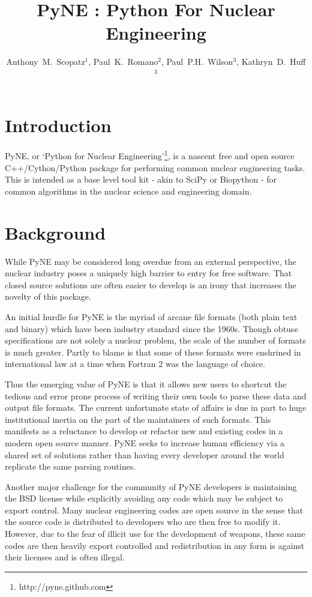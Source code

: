 \documentclass{anstrans}
\title{PyNE : Python For Nuclear Engineering}
\author{Anthony~M.~Scopatz$^1$, Paul~K.~Romano$^2$, Paul~P.H.~Wilson$^3$, Kathryn~D.~Huff$^3$}
\institute{$^1$ University of Chicago, $^2$ Massachusetts Institute of Technology, $^3$ University of Wisconsin }
\date{}
\begin{document}
\section{Introduction}

PyNE, or `Python for Nuclear Engineering'\footnote{http://pyne.github.com}, is a
nascent free and open source C++/Cython/Python package for performing common
nuclear engineering tasks.  This is intended as a base level tool kit - akin to
SciPy or Biopython - for common algorithms in the nuclear science and
engineering domain.

\section{Background}

While PyNE may be considered long overdue from an external perspective, the 
nuclear industry poses a uniquely high barrier to entry for free software.  
That closed source solutions are often easier to develop is an irony that 
increases the novelty of this package.

An initial hurdle for PyNE is the myriad of arcane file formats (both plain text
and binary) which have been industry standard since the 1960s.  Though obtuse 
specifications are not solely a nuclear problem, the scale of the number of formats 
is much greater.  Partly to blame is that some of these formats were enshrined 
in international law at a time when Fortran 2 was the language of choice.

Thus the emerging value of PyNE is that it allows new users to shortcut the tedious and 
error prone process of writing their own tools to parse these data and output file 
formats.  The current unfortunate state of affairs is due in part to huge institutional 
inertia on the part of the maintainers of such formats.  This manifests as a reluctance to 
develop or refactor new and existing codes in a modern open source manner.  PyNE seeks to 
increase human efficiency via a shared set of solutions rather than having every developer 
around the world replicate the same parsing routines.

Another major challenge for the community of PyNE developers is maintaining
the BSD license while explicitly avoiding any code which may be subject to 
export control.  Many nuclear engineering codes are open source in the sense
that the source code is distributed to developers who are then free to modify it.
However, due to the fear of illicit use for the development of weapons, these
same codes are then heavily export controlled and redistribution in any form is 
against their licenses and is often illegal.
\end{document}
